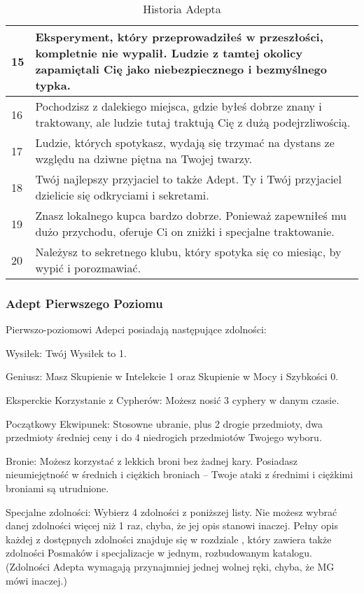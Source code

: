 \begin{table*}[t]
\begin{tabularx}{\textwidth}{| p{} | X |}
    15 & Eksperyment, który przeprowadziłeś w przeszłości, kompletnie nie wypalił. Ludzie z tamtej okolicy zapamiętali Cię jako niebezpiecznego i bezmyślnego typka. \\ \hline
    16 & Pochodzisz z dalekiego miejsca, gdzie byłeś dobrze znany i traktowany, ale ludzie tutaj traktują Cię z dużą podejrzliwością. \\ \hline
    17 & Ludzie, których spotykasz, wydają się trzymać na dystans ze względu na dziwne piętna na Twojej twarzy. \\ \hline
    18 & Twój najlepszy przyjaciel to także Adept. Ty i Twój przyjaciel dzielicie się odkryciami i sekretami. \\ \hline
    19 & Znasz lokalnego kupca bardzo dobrze. Ponieważ zapewniłeś mu dużo przychodu, oferuje Ci on zniżki i specjalne traktowanie.  \\ \hline
    20 & Należysz to sekretnego klubu, który spotyka się co miesiąc, by wypić i porozmawiać. \\ \hline
 \end{tabularx}
  \caption {Historia Adepta}
  \label {Historia Adepta}
 \end{table*}
 
 \afterpage{\clearpage}
 
 \subsubsection{Adept Pierwszego Poziomu}
 
 Pierwszo-poziomowi Adepci posiadają następujące zdolności:
 
Wysiłek: Twój Wysiłek to 1.

Geniusz: Masz Skupienie w Intelekcie 1 oraz Skupienie w Mocy i Szybkości 0.

Eksperckie Korzystanie z Cypherów: Możesz nosić 3 cyphery w danym czasie.

Początkowy Ekwipunek: Stosowne ubranie, plus 2 drogie przedmioty, dwa przedmioty średniej ceny i do 4 niedrogich przedmiotów Twojego wyboru.

Bronie: Możesz korzystać z lekkich broni bez żadnej kary. Posiadasz nieumiejętność w średnich i ciężkich broniach – Twoje ataki z średnimi i ciężkimi broniami są utrudnione.

Specjalne zdolności: Wybierz 4 zdolności z poniższej listy. Nie możesz wybrać danej zdolności więcej niż 1 raz, chyba, że jej opis stanowi inaczej. Pełny opis każdej z dostępnych zdolności znajduje się w rozdziale , który zawiera także zdolności Posmaków i specjalizacje w jednym, rozbudowanym katalogu. (Zdolności Adepta wymagają przynajmniej jednej wolnej ręki, chyba, że MG mówi inaczej.)

